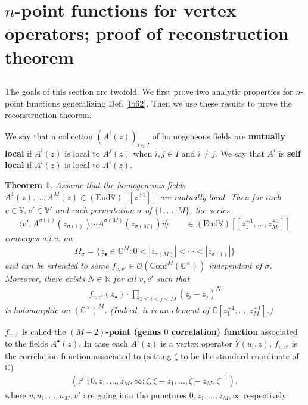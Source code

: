 \documentclass[11pt,b5paper,notitlepage]{article}
\theoremstyle{definition}
\theoremstyle{plain}
\newtheorem{thm}[df]{Theorem}
\newcommand{\End}{\mathrm{End}} %
\newcommand{\Conf}{\mathrm{Conf}}
\newcommand{\bigbk}[1]{\big\langle {#1}\big\rangle}
\newcommand{\scr}{\mathscr}
\newcommand{\blt}{\bullet}
\newcommand{\Vbb}{\mathbb V}
\newcommand{\Cbb}{\mathbb C}
\newcommand{\Nbb}{\mathbb N}
\newcommand{\Pbb}{\mathbb P}
\numberwithin{equation}{section}
\begin{document}
\section{$n$-point functions for vertex operators; proof of reconstruction theorem} \label{lb84}


\subsection{}\label{lb85}

The goals of this section are twofold. We first prove two analytic properties for $n$-point functions generalizing Def. \ref{lb62}. Then we use these results to prove the reconstruction theorem.

We say that a collection $(A^i(z))_{i\in I}$ of homogeneous fields are \textbf{mutually local}  if $A^i(z)$ is local to $A^j(z)$ when $i,j\in I$ and $i\neq j$. We say that $A^i$ is \textbf{self local}  if $A^i(z)$ is local to $A^i(z)$.


\begin{thm}\label{lb74}
Assume that the homogeneous fields $A^1(z),\dots,A^M(z)\in(\End\Vbb)[[z^{\pm1}]]$ are mutually local. Then for each $v\in\Vbb,v'\in\Vbb'$ and each permutation $\sigma$ of $\{1,\dots,M\}$, the series
\begin{align}
\bigbk{v',A^{\sigma(1)}(z_{\sigma(1)})\cdots A^{\sigma(M)}(z_{\sigma(M)})v}\qquad\in(\End\Vbb)[[z_1^{\pm1},\dots,z_M^{\pm1}]]\label{eq116}
\end{align}
converges a.l.u. on
\begin{align}
\Omega_\sigma=\{z_\blt\in\Cbb^M:0<|z_{\sigma(M)}|<\cdots<|z_{\sigma(1)}|\}	\label{eq115}
\end{align}
and can be extended to some $f_{v,v'}\in\scr O(\Conf^M(\Cbb^\times))$ independent of $\sigma$. Moreover, there exists $N\in\Nbb$ for all $v,v'$ such that
\begin{align}
f_{v,v'}(z_\blt)\cdot \prod_{1\leq i<j\leq M}(z_i-z_j)^N	
\end{align}
is holomorphic on $(\Cbb^\times)^M$. (Indeed, it is an element of $\Cbb[z_1^{\pm1},\dots,z_M^{\pm1}]$.)
\end{thm}

$f_{v,v'}$ is called the \textbf{$(M+2)$-point (genus $0$ correlation) function} associated to the fields $A^\blt(z)$. In case each $A^i(z)$ is a vertex operator $Y(u_i,z)$, $f_{v,v'}$ is the correlation function associated to (setting $\zeta$ to be the standard coordinate of $\Cbb$)
\begin{align}
(\Pbb^1;0,z_1,\dots,z_M,\infty;\zeta,\zeta-z_1,\dots,\zeta-z_M,\zeta^{-1}),	
\end{align}
where $v,u_1,\dots,u_M,v'$ are going into the punctures $0,z_1,\dots,z_M,\infty$ respectively.
\end{document}
